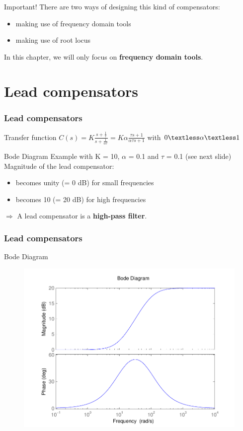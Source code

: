 \begin{frame}
\begin{block}{Important!}
There are two ways of designing this kind of compensators:
\begin{itemize}
\item making use of frequency domain tools
\item making use of root locus
\end{itemize}
In this chapter, we will only focus on {\bf frequency domain tools}.
\end{block}
\end{frame}

\section{Lead compensators}

\begin{frame}
\frametitle{Lead compensators}
	\begin{block}{Transfer function}
		$C(s) = K\frac{s + \frac{1}{\tau}}{s + \frac{1}{\alpha\tau}} =    K\alpha\frac{\tau s + 1}{\alpha\tau s + 1}$ with $0 \textless  \alpha  \textless  1$
	\end{block}
	\begin{block}{Bode Diagram}
		Example with K = 10, $\alpha$ = 0.1 and $\tau$ = 0.1 (see next slide) \\
		Magnitude of the lead compensator:
		\begin{itemize}
			\item becomes unity (= 0 dB) for small frequencies
			\item becomes 10 (= 20 dB) for high frequencies
		\end{itemize}
		$\Rightarrow$ A lead compensator is a {\bf high-pass filter}.
	\end{block}
\end{frame}

\begin{frame}
\frametitle{Lead compensators}
\begin{block}{Bode Diagram}
\begin{figure}
	\centering
	\includegraphics[width=0.7
	\linewidth]{bodeleadfilter2}
\end{figure}
\end{block}
\end{frame}

